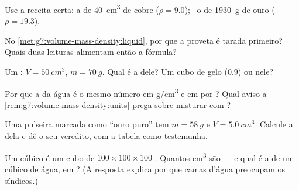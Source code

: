 \begin{exercise}[$\star$]\label{exo:g7:volume-mass-density:3}
Use a receita certa: a  de \qty{40}{cm^3} de cobre
($\rho = 9.0$); \ o  de \qty{1930}{g} de ouro
($\rho = 19.3$).
\end{exercise}

\begin{exercise}[$\star$]\label{exo:g7:volume-mass-density:4}
No \cref{met:g7:volume-mass-density:liquid}, por que a proveta é
tarada primeiro? Quais duas leituras alimentam então a fórmula?
\end{exercise}

\begin{exercise}[$\star$]\label{exo:g7:volume-mass-density:5}
Um : $V = \qty{50}{cm^3}$, $m = \qty{70}{g}$. Qual é a
 dele? Um cubo de gelo ($0.9$)  ou  nele?
\end{exercise}

\begin{exercise}[$\star$]\label{exo:g7:volume-mass-density:6}
Por que a  da água é o mesmo número em \unit{g/cm^3} e em
 por ? Qual aviso a
\cref{rem:g7:volume-mass-density:units} prega sobre misturar 
com ?
\end{exercise}

\begin{exercise}[$\star$]\label{exo:g7:volume-mass-density:7}
Uma pulseira marcada como ``ouro puro'' tem $m = \qty{58}{g}$ e
$V = \qty{5.0}{cm^3}$. Calcule a  dela e dê o seu veredito,
com a tabela como testemunha.
\end{exercise}

\begin{exercise}[$\star\star$]\label{exo:g7:volume-mass-density:8}
Um  cúbico é um cubo de $100 \times 100 \times 100$ .
Quantos \unit{cm^3} são --- e qual é a  de um  cúbico de
água, em ? (A resposta explica por que camas d'água
preocupam os síndicos.)
\end{exercise}

